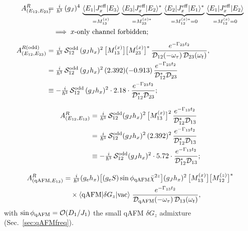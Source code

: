 \documentclass[reprint,amsmath,amssymb,aps,prb,longbibliography]{revtex4-2}
\begin{document}
\begin{widetext}
\begin{equation}
\begin{aligned}
A_{(E_{12},E_{23})}^{R}\!\!\!\! &= \tfrac{i}{\hbar^3}\,(g_J)^4\,
\underbrace{\langle E_1|J_x^{\rm eff}|E_3\rangle}_{=M_{13}^{(x)}}\,
\underbrace{\langle E_3|J_x^{\rm eff}|E_2\rangle^*}_{=M_{23}^{(x)*}}\,
\underbrace{\langle E_2|J_x^{\rm eff}|E_1\rangle^*}_{=M_{12}^{(x)*}=0}\,
\underbrace{\langle E_1|J_x^{\rm eff}|E_2\rangle}_{=M_{12}^{(x)}=0}\\
&\quad\Longrightarrow\;\text{$x$-only channel forbidden;}
\\[4pt]
A_{(E_{12},E_{23})}^{R({\rm odd})} &= \tfrac{i}{\hbar^3}\,\mathcal S_{12}^{\rm odd}\,(g_J h_x)^2\,
\bigl[M_{13}^{(x)}\bigr]\bigl[M_{23}^{(x)}\bigr]^*
\,\frac{e^{-\Gamma_{23}t_2}}{\mathcal D_{12}(-\omega_\tau)\,\mathcal D_{23}(\omega_t)},\\
&= \tfrac{i}{\hbar^3}\,\mathcal S_{12}^{\rm odd}\,(g_J h_x)^2\,(2.392)(-0.913)\,
\frac{e^{-\Gamma_{23}t_2}}{\mathcal D_{12}^*\mathcal D_{23}}\\
&\equiv -\tfrac{i}{\hbar^3}\,\mathcal S_{12}^{\rm odd}\,(g_J h_x)^2\cdot 2.18\cdot
\frac{e^{-\Gamma_{23}t_2}}{\mathcal D_{12}^*\mathcal D_{23}};
\end{aligned}
\label{eq:A_E12E23_full}
\end{equation}

\begin{equation}
\begin{aligned}
A_{(E_{12},E_{13})}^{R} &= \tfrac{i}{\hbar^3}\,\mathcal S_{12}^{\rm odd}(g_J h_x)^2\,
\bigl[M_{13}^{(x)}\bigr]^2\,
\frac{e^{-\Gamma_{13}t_2}}{\mathcal D_{12}^*\mathcal D_{13}}\\
&= \tfrac{i}{\hbar^3}\,\mathcal S_{12}^{\rm odd}(g_J h_x)^2\,(2.392)^2\,
\frac{e^{-\Gamma_{13}t_2}}{\mathcal D_{12}^*\mathcal D_{13}}\\
&\equiv -\tfrac{i}{\hbar^3}\,\mathcal S_{12}^{\rm odd}(g_J h_x)^2\cdot 5.72\cdot
\frac{e^{-\Gamma_{13}t_2}}{\mathcal D_{12}^*\mathcal D_{13}};
\end{aligned}
\label{eq:A_E12E13_full}
\end{equation}

\begin{equation}
\begin{aligned}
A_{(\mathrm{qAFM},E_{13})}^{R}&=\tfrac{i}{\hbar^3}(g_e h_x)\bigl[(g_e S)\sin\phi_{\rm qAFM}\bar\chi^{2z}\bigr](g_J h_x)^2\,
\bigl[M_{13}^{(x)}\bigr]\bigl[M_{12}^{(z)}\bigr]^*\\
&\quad\times\langle{\rm qAFM}|\delta G_z|{\rm vac}\rangle\;
\frac{e^{-\Gamma_{13}t_2}}{\mathcal D_{\rm qAFM}(-\omega_\tau)\,\mathcal D_{13}(\omega_t)},
\end{aligned}
\label{eq:A_qAFME13_full}
\end{equation}
with $\sin\phi_{\rm qAFM}=\mathcal O(D_1/J_1)$ the small qAFM
$\delta G_z$ admixture (Sec.~\ref{sec:qAFMfreq}).


\end{widetext}
\end{document}
